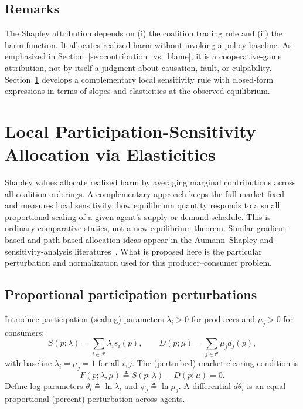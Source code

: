 \documentclass[journal, a4paper]{IEEEtran}
\begin{document}
\subsection{Remarks}
The Shapley attribution depends on (i) the coalition trading rule and (ii) the harm function. It allocates realized harm without invoking a policy baseline. As emphasized in Section~\ref{sec:contribution_vs_blame}, it is a cooperative-game attribution, not by itself a judgment about causation, fault, or culpability. Section~\ref{sec:elasticity} develops a complementary local sensitivity rule with closed-form expressions in terms of slopes and elasticities at the observed equilibrium.

\section{Local Participation-Sensitivity Allocation via Elasticities}
\label{sec:elasticity}
Shapley values allocate realized harm by averaging marginal contributions across all coalition orderings. A complementary approach keeps the full market fixed and measures local sensitivity: how equilibrium quantity responds to a small proportional scaling of a given agent's supply or demand schedule. This is ordinary comparative statics, not a new equilibrium theorem. Similar gradient-based and path-based allocation ideas appear in the Aumann--Shapley and sensitivity-analysis literatures~\cite{AumannShapley1974,Owen2014,SongNelsonStaum2016}. What is proposed here is the particular perturbation and normalization used for this producer--consumer problem.

\subsection{Proportional participation perturbations}
Introduce participation (scaling) parameters $\lambda_i>0$ for producers and $\mu_j>0$ for consumers:
\begin{equation}
S(p;\lambda)=\sum_{i\in\mathcal{P}} \lambda_i s_i(p),\qquad
D(p;\mu)=\sum_{j\in\mathcal{C}} \mu_j d_j(p),
\end{equation}
with baseline $\lambda_i=\mu_j=1$ for all $i,j$. The (perturbed) market-clearing condition is
\begin{equation}
F(p;\lambda,\mu)\triangleq S(p;\lambda)-D(p;\mu)=0.
\label{eq:F}
\end{equation}
Define log-parameters $\theta_i\triangleq \ln \lambda_i$ and $\psi_j\triangleq \ln \mu_j$. A differential $d\theta_i$ is an equal proportional (percent) perturbation across agents.
\end{document}
